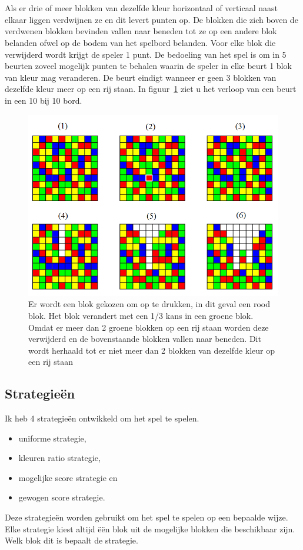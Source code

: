 \documentclass[12pt,a4paper,oneside]{book}
\theoremstyle{definition}
\begin{document}
\renewcommand{\arraystretch}{1}
\\\\
Als er drie of meer blokken van dezelfde kleur horizontaal of verticaal naast elkaar liggen verdwijnen ze en dit levert punten op. De blokken die zich boven de verdwenen blokken bevinden vallen naar beneden tot ze op een andere blok belanden ofwel op de bodem van het spelbord belanden. Voor elke blok die verwijderd wordt krijgt de speler 1 punt. De bedoeling van het spel is om in 5 beurten zoveel mogelijk punten te behalen waarin de speler in elke beurt 1 blok van kleur mag veranderen. De beurt eindigt wanneer er geen 3 blokken van dezelfde kleur meer op een rij staan. In figuur~\ref{figure:boardturn} ziet u het verloop van een beurt in een 10 bij 10 bord.
\begin{figure}
	\centering
	\includegraphics[height=80truemm]{turn}
	\caption{Er wordt een blok gekozen om op te drukken, in dit geval een rood blok. Het blok verandert met een 1/3 kans in een groene blok. Omdat er meer dan 2 groene blokken op een rij staan worden deze verwijderd en de bovenstaande blokken vallen naar beneden. Dit wordt herhaald tot er niet meer dan 2 blokken van dezelfde kleur op een rij staan}
	\label{figure:boardturn}
\end{figure}
\subsection{Strategie\"{e}n}
Ik heb 4 strategie\"{e}n ontwikkeld om het spel te spelen.
\begin{itemize}
	\item uniforme strategie,
	\item kleuren ratio strategie,
	\item mogelijke score strategie en
	\item gewogen score strategie.
\end{itemize}
Deze strategie\"{e}n worden gebruikt om het spel te spelen op een bepaalde wijze. Elke strategie kiest altijd \"{e}\"{e}n blok uit de mogelijke blokken die beschikbaar zijn. Welk blok dit is bepaalt de strategie.
\end{document}
